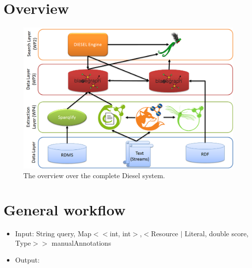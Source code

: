 \documentclass{scrartcl}
\begin{document}
\section{Overview}

\begin{figure}
\centering
\includegraphics[width=\textwidth,keepaspectratio]{architecture.png}
\caption{The overview over the complete Diesel system.}
\label{fig:exp1-unique-results}
\end{figure}

\section{General workflow}

\begin{itemize}
	\item Input: String query, Map$<<$int, int$>$,$<$Resource $|$ Literal, double score, Type$>>$ manualAnnotations
	\item Output: 
\end{itemize}
\end{document}
